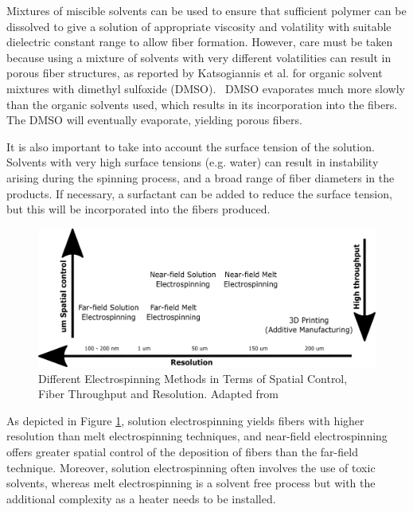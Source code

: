 Mixtures of miscible solvents can be used to ensure that sufficient polymer can be dissolved to give a solution of appropriate viscosity and volatility with suitable dielectric constant range to allow fiber formation. However, care must be taken because using a mixture of solvents with very different volatilities can result in porous fiber structures, as reported by Katsogiannis et al. for organic solvent mixtures with dimethyl sulfoxide (DMSO).\unskip~\cite{527120:13082766} DMSO evaporates much more slowly than the organic solvents used, which results in its incorporation into the fibers. The DMSO will eventually evaporate, yielding porous fibers.

It is also important to take into account the surface tension of the solution. Solvents with very high surface tensions (e.g. water) can result in instability arising during the spinning process, and a broad range of fiber diameters in the products. If necessary, a surfactant can be added to reduce the surface tension, but this will be incorporated into the fibers produced.
    
\begin{figure}[!th]
\centering
\includegraphics[scale=0.45]{./Figures/DifferentElectrospinningMethods.png}
\decoRule
\caption[Different Electrospinning Methods in Terms of Spatial Control, Fiber Throughput and Resolution]{Different Electrospinning Methods in Terms of Spatial Control, Fiber Throughput and Resolution. Adapted from \cite{Tourlomousis2017}}
\label{fig:DifferentElectrospinningMethods}
\end{figure}

As depicted in Figure \ref{fig:DifferentElectrospinningMethods}, solution electrospinning yields fibers with higher resolution than melt electrospinning techniques, and near-field electrospinning offers greater spatial control of the deposition of fibers than the far-field technique. Moreover, solution electrospinning often involves the use of toxic solvents, whereas melt electrospinning is a solvent free process but with the additional complexity as a heater needs to be installed. \cite{Tourlomousis2017}    
    
